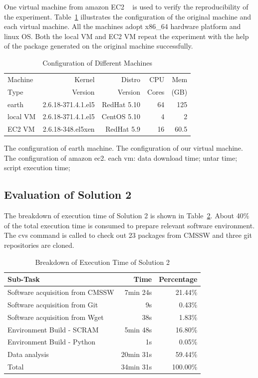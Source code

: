 \documentclass{acm_proc_article-sp}
\begin{document}
One virtual machine from amazon EC2 ~\cite{amazon2010amazon} is used to verify the reproducibility of the experiment. Table~\ref{table:config-vm} illustrates the configuration of the original machine and each virtual machine. 
All the machines adopt x86\_64 hardware platform and linux OS.
Both the local VM and EC2 VM repeat the experiment with the help of the package generated on the original machine successfully.

\begin{table}
    \centering
    \begin{tabular}{|l|r|r|r|r|}
    \hline
    Machine & Kernel & Distro & CPU & Mem\\ 
    Type & Version & Version & Cores & (GB)\\ \hline
    earth  & 2.6.18-371.4.1.el5 & RedHat 5.10 & 64 & 125 \\ \hline 
    local VM& 2.6.18-371.4.1.el5 & CentOS 5.10 & 4 & 2 \\ \hline
    EC2 VM& 2.6.18-348.el5xen & RedHat 5.9 & 16 & 60.5 \\ \hline
    \end{tabular}
    \caption{Configuration of Different Machines}
    \label{table:config-vm}
\end{table}



The configuration of earth machine. The configuration of our virtual machine. The configuration of amazon ec2.
each vm: data download time; untar time; script execution time;

\subsection{Evaluation of Solution 2}
The breakdown of execution time of Solution 2 is shown in Table~\ref{table:time-2nd}. About 40\%  of the total execution time is consumed to prepare relevant software environment. The cvs command is called to check out 23 packages from CMSSW and three git repositories are cloned.

\begin{table}
    \centering
    \begin{tabular}{|l|r|r|}
    \hline
    Sub-Task & Time & Percentage \\ \hline
    Software acquisition from CMSSW & 7min 24s & 21.44\% \\ \hline
    Software acquisition from Git & 9s & 0.43\% \\ \hline
    Software acquisition from Wget & 38s & 1.83\% \\ \hline
    Environment Build - SCRAM & 5min 48s & 16.80\% \\ \hline
    Environment Build - Python & 1s & 0.05\% \\ \hline
    Data analysis & 20min 31s & 59.44\% \\ \hline
    Total & 34min 31s & 100.00\% \\ \hline
    \end{tabular}
    \caption{Breakdown of Execution Time of Solution 2}
    \label{table:time-2nd}
\end{table}
\end{document}
